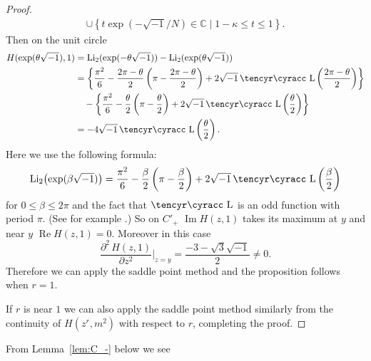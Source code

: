 \documentclass[a4paper]{amsart}
\def\cyr{\tencyr\cyracc}
\theoremstyle{plain}
\theoremstyle{definition}
\theoremstyle{remark}
\newcommand{\C}{\mathbb{C}}
\newcommand{\Lob}{\operatorname{\text{\cyr L}}}
\newcommand{\Li}{\operatorname{Li}}
\renewcommand{\Re}{\operatorname{Re}}
\renewcommand{\Im}{\operatorname{Im}}
\numberwithin{equation}{section}
\begin{document}
\begin{proof}
\begin{equation*}
\begin{split}
  \cup
  \left\{
    t\exp(-\sqrt{-1}/N)\in\C\mid1-\kappa\le{t}\le1
  \right\}.
\end{split}
\end{equation*}
Then on the unit circle
\begin{equation}\label{eq:H_on_circle}
\begin{split}
  H(\exp(\theta\sqrt{-1}),1)
  &=
  \Li_2(\exp(-\theta\sqrt{-1}))-\Li_2(\exp(\theta\sqrt{-1}))
  \\
  &=
  \left\{
    \frac{\pi^2}{6}
    -
    \frac{2\pi-\theta}{2}
    \left(\pi-\frac{2\pi-\theta}{2}\right)
    +
    2\sqrt{-1}\Lob\left(\frac{2\pi-\theta}{2}\right)
  \right\}
  \\
  &\quad
  -
  \left\{
    \frac{\pi^2}{6}
    -
    \frac{\theta}{2}\left(\pi-\frac{\theta}{2}\right)
    +
    2\sqrt{-1}\Lob\left(\frac{\theta}{2}\right)
  \right\}
  \\
  &=
  -4\sqrt{-1}\Lob\left(\frac{\theta}{2}\right).
\end{split}
\end{equation}
Here we use the following formula:
\begin{equation}\label{eq:dilog}
  \Li_2\bigl(\exp(\beta\sqrt{-1})\bigr)
  =
  \frac{\pi^2}{6}
  -
  \frac{\beta}{2}\left(\pi-\frac{\beta}{2}\right)
  +
  2\sqrt{-1}\Lob\left(\frac{\beta}{2}\right)
\end{equation}
for $0\le\beta\le2\pi$ and the fact that $\Lob$ is an odd function with period
$\pi$.
(See for example \cite[p. 18]{Milnor:BULAM382}.)
So on ${C'}_{+}$ $\Im{H(z,1)}$ takes its maximum at $y$ and near $y$
$\Re{H(z,1)}=0$.
Moreover in this case
\begin{equation*}
  \frac{\partial^2\,H(z,1)}{\partial{z^2}}\Biggr|_{z=y}
  =
  \frac{-3-\sqrt{3}\sqrt{-1}}{2}
  \ne0.
\end{equation*}
Therefore we can apply the saddle point method and the proposition follows when
$r=1$.
\par
If $r$ is near $1$ we can also apply the saddle point method similarly from the
continuity of $H(z^r,m^2)$ with respect to $r$, completing the proof.
\end{proof}
\par
From Lemma~\ref{lem:C_-} below we see
\end{document}
